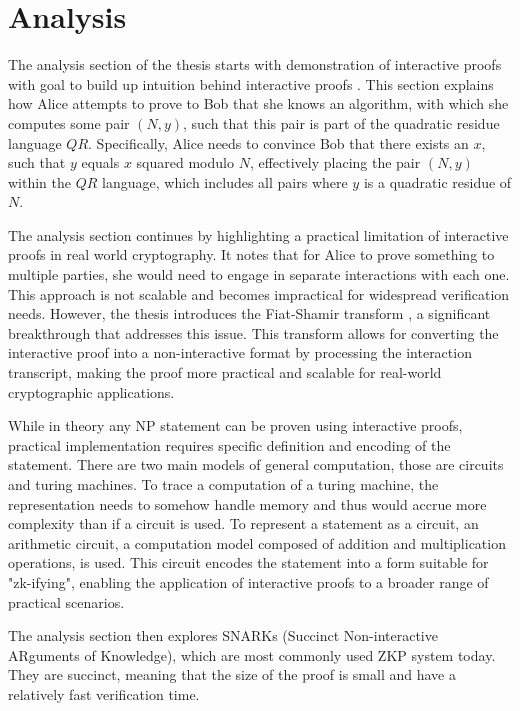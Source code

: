 \chapter{Analysis}

The analysis section of the thesis starts with demonstration of interactive
proofs with goal to build up intuition behind interactive proofs \cite{Goldwasser1989,youtubeMOOCLecture1}.
This section explains how Alice attempts to prove to Bob that she knows an
algorithm, with which she computes some pair $(N, y)$, such that this pair is
part of the quadratic residue language $QR$. Specifically, Alice needs to
convince Bob that there exists an $x$, such that $y$ equals $x$ squared modulo $N$,
effectively placing the pair $(N, y)$ within the $QR$ language, which includes all
pairs where $y$ is a quadratic residue of $N$.

The analysis section continues by highlighting a practical limitation of
interactive proofs in real world cryptography. It notes that for Alice to
prove something to multiple parties, she would need to engage in separate
interactions with each one. This approach is not scalable and becomes
impractical for widespread verification needs. However, the thesis introduces
the Fiat-Shamir transform \cite{Fiat}, a significant breakthrough that addresses this
issue. This transform allows for converting the interactive proof into a
non-interactive format by processing the interaction transcript, making the
proof more practical and scalable for real-world cryptographic applications.

While in theory any NP statement \cite{goldreich1991proofs} can be proven using
interactive proofs, practical implementation requires specific definition and
encoding of the statement. There are two main models of general computation,
those are circuits and turing machines. To trace a computation of a turing
machine, the representation needs to somehow handle memory and thus would accrue
more complexity than if a circuit is used. To represent a statement as a
circuit, an arithmetic circuit, a computation model composed of addition and
multiplication operations, is used. This circuit encodes the statement into a
form suitable for "zk-ifying", enabling the application of interactive proofs
to a broader range of practical scenarios.

The analysis section then explores SNARKs (Succinct Non-interactive ARguments
of Knowledge), which are most commonly used ZKP system today. They are succinct,
meaning that the size of the proof is small and have a relatively fast verification
time.

